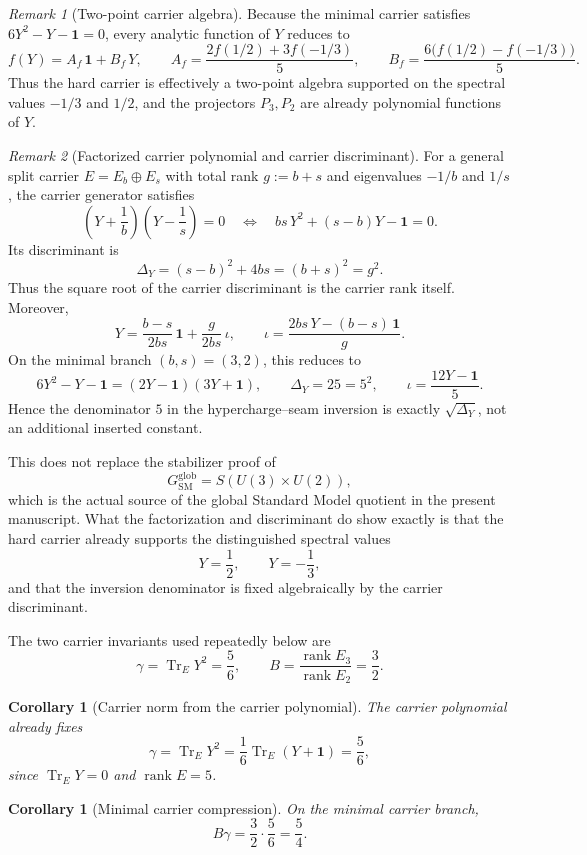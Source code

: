 \documentclass[11pt,a4paper]{article}
\newtheorem{corollary}[theorem]{Corollary}
\theoremstyle{definition}
\theoremstyle{remark}
\newtheorem*{remark}{Remark}
\DeclareMathOperator{\tr}{Tr}
\DeclareMathOperator{\rank}{rank}
\newcommand{\inv}{\iota}
\newcommand{\SM}{\mathrm{SM}}
\begin{document}
\begin{remark}[Two-point carrier algebra]
Because the minimal carrier satisfies $6Y^2-Y-\mathbf 1=0$, every analytic function of $Y$ reduces to
\[
f(Y)=A_f\,\mathbf 1+B_f\,Y,
\qquad
A_f=\frac{2f(1/2)+3f(-1/3)}{5},
\qquad
B_f=\frac{6\bigl(f(1/2)-f(-1/3)\bigr)}{5}.
\]
Thus the hard carrier is effectively a two-point algebra supported on the spectral values $-1/3$ and $1/2$, and the projectors $P_3,P_2$ are already polynomial functions of $Y$.
\end{remark}

\begin{remark}[Factorized carrier polynomial and carrier discriminant]\label{rem:carrier-discriminant}
For a general split carrier $E=E_b\oplus E_s$ with total rank $g:=b+s$ and eigenvalues $-1/b$ and $1/s$, the carrier generator satisfies
\[
\left(Y+\frac{1}{b}\right)\left(Y-\frac{1}{s}\right)=0
\quad\Longleftrightarrow\quad
bs\,Y^2+(s-b)Y-\mathbf 1=0.
\]
Its discriminant is
\[
\Delta_Y=(s-b)^2+4bs=(b+s)^2=g^2.
\]
Thus the square root of the carrier discriminant is the carrier rank itself. Moreover,
\[
Y=\frac{b-s}{2bs}\,\mathbf 1+\frac{g}{2bs}\,\inv,
\qquad
\inv=\frac{2bs\,Y-(b-s)\,\mathbf 1}{g}.
\]
On the minimal branch $(b,s)=(3,2)$, this reduces to
\[
6Y^2-Y-\mathbf 1=(2Y-\mathbf 1)(3Y+\mathbf 1),
\qquad
\Delta_Y=25=5^2,
\qquad
\inv=\frac{12Y-\mathbf 1}{5}.
\]
Hence the denominator $5$ in the hypercharge--seam inversion is exactly $\sqrt{\Delta_Y}$, not an additional inserted constant.

This does not replace the stabilizer proof of
\[
G_{\SM}^{\mathrm{glob}}=S(U(3)\times U(2)),
\]
which is the actual source of the global Standard Model quotient in the present manuscript. What the factorization and discriminant do show exactly is that the hard carrier already supports the distinguished spectral values
\[
Y=\frac{1}{2},
\qquad
Y=-\frac{1}{3},
\]
and that the inversion denominator is fixed algebraically by the carrier discriminant.
\end{remark}

The two carrier invariants used repeatedly below are
\[
\gamma=\tr_EY^2=\frac56,
\qquad
B=\frac{\rank E_3}{\rank E_2}=\frac32.
\]
\begin{corollary}[Carrier norm from the carrier polynomial]
The carrier polynomial already fixes
\[
\gamma=\tr_EY^2=\frac16\tr_E(Y+\mathbf 1)=\frac56,
\]
since $\tr_EY=0$ and $\rank E=5$.
\end{corollary}

\begin{corollary}[Minimal carrier compression]
\label{cor:minimal-carrier-compression}
On the minimal carrier branch,
\[
B\gamma=\frac32\cdot\frac56=\frac54.
\]
\end{corollary}
\end{document}
